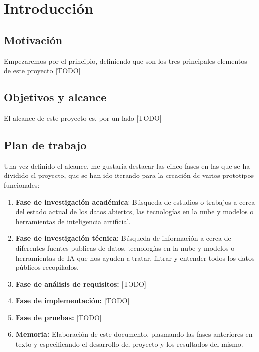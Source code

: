 \chapter{Introducción}
\label{cap:introduccion}


\section{Motivación}

Empezaremos por el principio, definiendo que son los tres principales elementos de este proyecto [TODO]


\section{Objetivos y alcance}

El alcance de este proyecto es, por un lado [TODO]

\section{Plan de trabajo}


Una vez definido el alcance, me gustaría destacar las cinco fases en las que se ha dividido el proyecto, que se han ido iterando para la creación de varios prototipos funcionales:


\begin{enumerate}
	
	\item \textbf{Fase de investigación académica:} Búsqueda de estudios o trabajos a cerca del estado actual de los datos abiertos, las tecnologías en la nube y modelos o herramientas de inteligencia artificial.
	
	\item \textbf{Fase de investigación técnica:} Búsqueda de información a cerca de diferentes fuentes publicas de datos,  tecnologías en la nube y modelos o herramientas de IA que nos ayuden a tratar, filtrar y entender todos los datos públicos recopilados.
	
	\item \textbf{Fase de análisis de requisitos:} [TODO]
	
	\item \textbf{Fase de implementación:} [TODO]
	
	\item \textbf{Fase de pruebas:} [TODO]
	
	\item \textbf{Memoria:} Elaboración de este documento, plasmando las fases anteriores en texto y especificando el desarrollo del proyecto y los resultados del mismo.
\end{enumerate}

